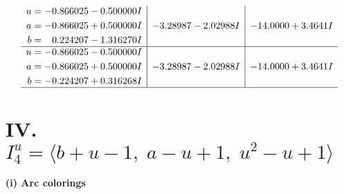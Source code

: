 \documentclass[1p]{elsarticle_modified}
\theoremstyle{definition}
\begin{document}
$$\begin{array}{c|c|c}
\begin{aligned}
u &= -0.866025 - 0.500000 I \\
a &= -0.866025 + 0.500000 I \\
b &= \phantom{-}0.224207 - 1.316270 I\end{aligned}
 & -3.28987 - 2.02988 I & -14.0000 + 3.4641 I \\ \hline\begin{aligned}
u &= -0.866025 - 0.500000 I \\
a &= -0.866025 + 0.500000 I \\
b &= -0.224207 + 0.316268 I\end{aligned}
 & -3.28987 - 2.02988 I & -14.0000 + 3.4641 I\\
 \hline 
 \end{array}$$\newpage\newpage\renewcommand{\arraystretch}{1}
\centering \section*{IV. $I^u_{4}= \langle b+u-1,\;a- u+1,\;u^2- u+1 \rangle$}
\flushleft \textbf{(i) Arc colorings}\\
\end{document}
